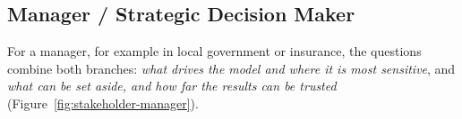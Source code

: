 \subsection{Manager / Strategic Decision Maker}
For a manager, for example in local government or insurance, the questions combine both
branches: \emph{what drives the model and where it is most sensitive}, and \emph{what can be set
aside, and how far the results can be trusted}
(Figure~\ref{fig:stakeholder-manager}).\par\medskip
%


